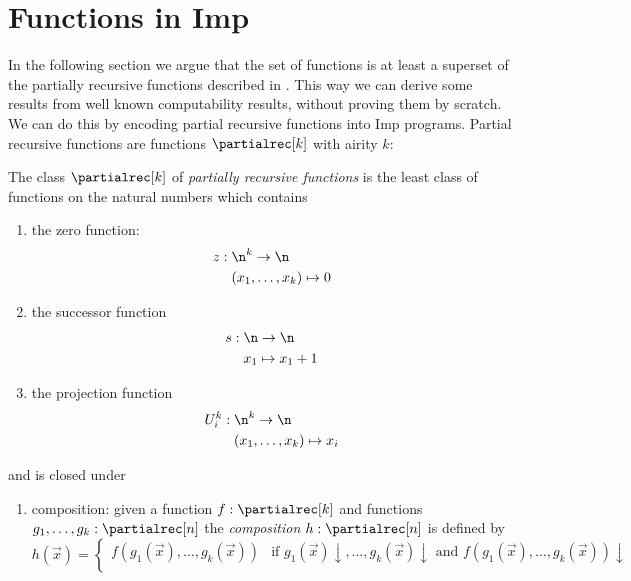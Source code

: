 \section{Functions in Imp}\label{sec:functionsimp}
In the following section we argue that the set of functions is at
least a superset of the partially recursive functions described in
\cite{cutland1980computability}. This way we can derive some results
from well known computability results, without proving them by
scratch. We can do this by encoding partial recursive functions into
Imp programs.  Partial recursive functions are functions
\(\partialrec[k]\) with airity \(k\):
\begin{definition}
  The class \(\partialrec[k]\) of \emph{partially recursive functions}
  is the least class of functions on the natural numbers which
  contains
  \begin{enumerate}[label=(\alph*)]
  \item\label{parec:a} the zero function:
    \begin{align*}
      z : \; & \n^k \to \n \\
      & (x_1, \dots, x_k) \mapsto 0
    \end{align*}
  \item\label{parec:b} the successor function
    \begin{align*}
      s : \; & \n \to \n \\
      & x_1 \mapsto x_1 + 1
    \end{align*}
  \item\label{parec:c} the projection function
    \begin{align*}
      U_i^k : \; & \n^k \to \n \\
      & (x_1,\dots,x_k) \mapsto x_i
    \end{align*}
  \end{enumerate}
  and is closed under
  \begin{enumerate}[label=(\arabic*)]
  \item\label{parec:1} composition: given a function
    \(f : \partialrec[k]\) and functions
    \(g_1, \dots, g_k : \partialrec[n]\) the \emph{composition}
    \(h : \partialrec[n]\) is defined by
    \begin{equation*}
      h(\vec{x}) =
      \begin{cases}
        f(g_1(\vec{x}), \dots, g_k(\vec{x})) & \text{if } g_1(\vec{x}) \downarrow, \dots, g_k(\vec{x}) \downarrow \text{ and } f(g_1(\vec{x}), \dots, g_k(\vec{x})) \downarrow \\

\end{cases}
\end{equation*}
\end{enumerate}
\end{definition}
